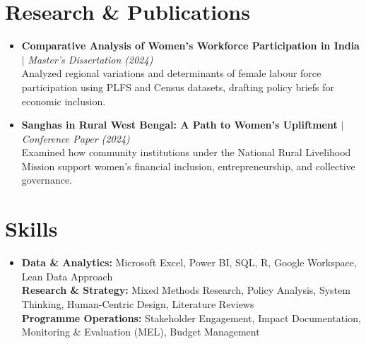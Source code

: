 ﻿\documentclass[11pt,a4paper]{article}
\begin{document}
\section*{Research \& Publications}
\begin{itemize}[leftmargin=0in, label={}]
  \vspace{0.5ex}\item[]
    \textbf{Comparative Analysis of Women's Workforce Participation in India} $|$ \textit{Master's Dissertation (2024)} \\
    \small{Analyzed regional variations and determinants of female labour force participation using PLFS and Census datasets, drafting policy briefs for economic inclusion.}
  \vspace{1ex}\item[]
    \textbf{Sanghas in Rural West Bengal: A Path to Women's Upliftment} $|$ \textit{Conference Paper (2024)} \\
    \small{Examined how community institutions under the National Rural Livelihood Mission support women's financial inclusion, entrepreneurship, and collective governance.}
\end{itemize}

\section*{Skills}
\begin{itemize}[leftmargin=0in, label={}]
  \vspace{0.5ex}\item[]
    \small{\textbf{Data \& Analytics:} Microsoft Excel, Power BI, SQL, R, Google Workspace, Lean Data Approach} \\
    \small{\textbf{Research \& Strategy:} Mixed Methods Research, Policy Analysis, System Thinking, Human-Centric Design, Literature Reviews} \\
    \small{\textbf{Programme Operations:} Stakeholder Engagement, Impact Documentation, Monitoring \& Evaluation (MEL), Budget Management}
\end{itemize}
\end{document}
